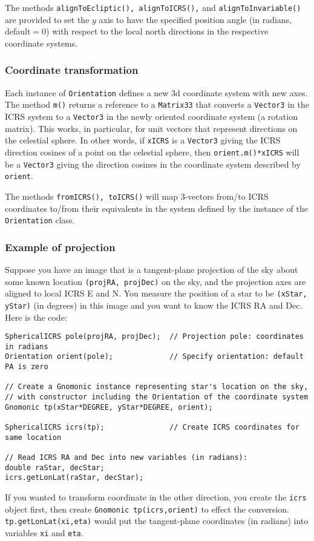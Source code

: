 \documentclass[11pt,preprint,flushrt]{aastex}
\begin{document}
The methods {\tt alignToEcliptic(), alignToICRS(),} and {\tt alignToInvariable()} are provided to set the $y$ axis to have the specified position angle (in radians, default$=0$) with respect to the local north directions in the respective coordinate systems.  

\subsubsection{Coordinate transformation}
Each instance of {\tt Orientation} defines a new 3d coordinate system with new axes.  The method {\tt m()} returns a reference to a {\tt Matrix33} that converts a {\tt Vector3} in the ICRS system to a {\tt Vector3} in the newly oriented coordinate system (a rotation matrix).  This works, in particular, for unit vectors that represent directions on the celestial sphere.  In other words, if {\tt xICRS} is a {\tt Vector3} giving the ICRS direction cosines of a point on the celestial sphere, then {\tt orient.m()*xICRS} will be a {\tt Vector3} giving the direction cosines in the coordinate system described by {\tt orient}.

The methods {\tt fromICRS(), toICRS()} will map 3-vectors from/to ICRS coordinates to/from their equivalents in the system defined by the instance of the {\tt Orientation} class.

\subsubsection{Example of projection}
Suppose you have an image that is a tangent-plane projection of the sky about some known location {\tt (projRA, projDec)} on the sky, and the projection axes are aligned to local ICRS E and N.  You measure the position of a star to be {\tt (xStar, yStar)} (in degrees) in this image and you want to know the ICRS RA and Dec.  Here is the code:
\begin{verbatim}
SphericalICRS pole(projRA, projDec);  // Projection pole: coordinates in radians
Orientation orient(pole);             // Specify orientation: default PA is zero

// Create a Gnomonic instance representing star's location on the sky,
// with constructor including the Orientation of the coordinate system
Gnomonic tp(xStar*DEGREE, yStar*DEGREE, orient);

SphericalICRS icrs(tp);               // Create ICRS coordinates for same location

// Read ICRS RA and Dec into new variables (in radians):
double raStar, decStar;
icrs.getLonLat(raStar, decStar);
\end{verbatim}
If you wanted to transform coordinate in the other direction, you create the {\tt icrs} object first, then create {\tt Gnomonic tp(icrs,orient)} to effect the conversion.  {\tt tp.getLonLat(xi,eta)} would put the tangent-plane coordinates (in radians) into variables {\tt xi} and {\tt eta}.
\end{document}
